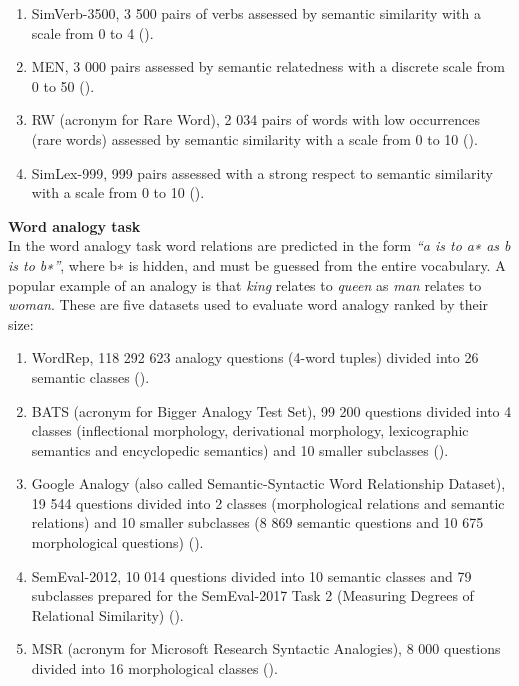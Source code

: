 \documentclass[]{krantz}
\providecommand{\tightlist}{%
  \setlength{\itemsep}{0pt}\setlength{\parskip}{0pt}}
\begin{document}
\begin{enumerate}
\def\labelenumi{\arabic{enumi}.}
\tightlist
\item
  SimVerb-3500, 3 500 pairs of verbs assessed by semantic similarity with a scale from 0 to 4 (\citet{gerz2016simverb}).
\item
  MEN, 3 000 pairs assessed by semantic relatedness with a discrete scale from 0 to 50 (\citet{bruni2014multimodal}).
\item
  RW (acronym for Rare Word), 2 034 pairs of words with low occurrences (rare words) assessed by semantic similarity with a scale from 0 to 10 (\citet{luong2013better}).
\item
  SimLex-999, 999 pairs assessed with a strong respect to semantic similarity with a scale from 0 to 10 (\citet{hill2015simlex}).
\end{enumerate}

\textbf{Word analogy task}\\
In the word analogy task word relations are predicted in the form \emph{``a is to a∗ as b is to b∗''}, where b∗ is hidden, and must be guessed from the entire vocabulary. A popular example of an analogy is that \emph{king} relates to \emph{queen} as \emph{man} relates to \emph{woman}. These are five datasets used to evaluate word analogy ranked by their size:

\begin{enumerate}
\def\labelenumi{\arabic{enumi}.}
\tightlist
\item
  WordRep, 118 292 623 analogy questions (4-word tuples) divided into 26 semantic classes (\citet{gao2014wordrep}).
\item
  BATS (acronym for Bigger Analogy Test Set), 99 200 questions divided into 4 classes (inflectional morphology, derivational morphology, lexicographic semantics and encyclopedic semantics) and 10 smaller subclasses (\citet{gladkova2016intrinsic}).
\item
  Google Analogy (also called Semantic-Syntactic Word Relationship Dataset), 19 544 questions divided into 2 classes (morphological relations and semantic relations) and 10 smaller subclasses (8 869 semantic questions and 10 675 morphological questions) (\citet{mikolov2013efficient}).
\item
  SemEval-2012, 10 014 questions divided into 10 semantic classes and 79 subclasses prepared for the SemEval-2017 Task 2 (Measuring Degrees of Relational Similarity) (\citet{jurgens2012semeval}).
\item
  MSR (acronym for Microsoft Research Syntactic Analogies), 8 000 questions divided into 16 morphological classes (\citet{mikolov2013linguistic}).
\end{enumerate}
\end{document}
